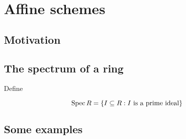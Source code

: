 \chapter{Affine schemes}

\section{Motivation}
\label{sec:motivation-for-affine-schemes}

\section{The spectrum of a ring}
\label{sec:the-spectrum-of-a-ring}

Define

\[ \operatorname{Spec} R = \{ I \subseteq R : I \text{ is a prime ideal} \} \]

\section{Some examples}
\label{sec:examples-of-affine-schemes}
